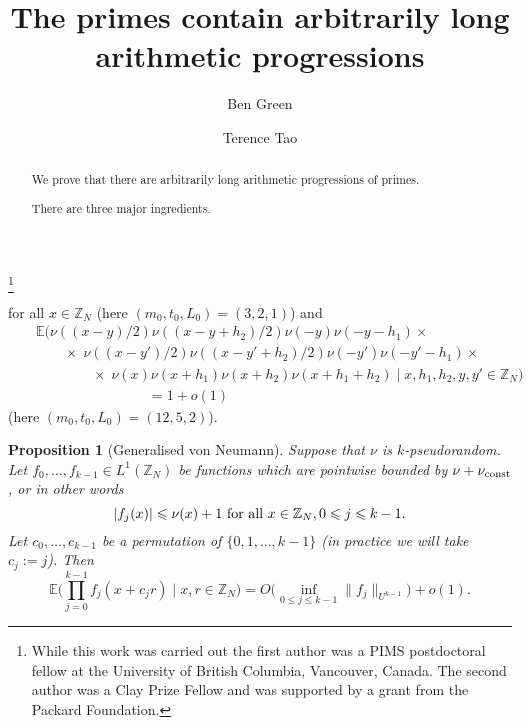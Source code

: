 \documentclass[12pt,a4paper,reqno]{amsart}
\numberwithin{equation}{section}
\theoremstyle{plain}
\newtheorem{proposition}[subsection]{Proposition}
\theoremstyle{definition}
\renewcommand{\leq}{\leqslant}
\def\vconstlem{\ensuremath \nu_{\mbox{\scriptsize \textup{const}}}}
\def\Z{{\mathbb Z}}
\def\E{{\mathbb E}}
\def\vs{\vspace{11pt}}
\def\ni{\noindent}
\begin{document}
\title{The primes contain arbitrarily long arithmetic progressions}

\author{Ben Green}
\address{School of Mathematics\\
University Walk\\
Bristol\\
BS8 1TW
}

\author{Terence Tao}
\address{Department of Mathematics\\University of California at Los Angeles\\ Los Angeles CA 90095}


\thanks{While this work was carried out the first author was a PIMS postdoctoral fellow at the University of British Columbia, Vancouver, Canada.  The second author was
a Clay Prize Fellow and was supported by a grant from the Packard Foundation.}


\begin{abstract}
We prove that there are arbitrarily long arithmetic progressions of primes.\vs  

\ni There are three major ingredients. \SNIP

\end{abstract}


\maketitle

\SNIP \ni %
for all $x \in \Z_N$ (here $(m_0,t_0, L_0) = (3,2,1)$) and
\begin{eqnarray}\nonumber& & 
\E\bigg( \nu((x-y)/2) \nu((x-y+h_2)/2) \nu(-y) \nu(-y-h_1) \times \\ & & \nonumber
\qquad \times \; \nu((x-y')/2) \nu((x-y'+h_2)/2)  \nu(-y') \nu(-y'-h_1) \times \\ & &
\qquad \qquad \times \; \nu(x) \nu(x+h_1) \nu(x+h_2) \nu(x+h_1+h_2) \; 
\bigg| \; x,h_1,h_2,y,y' \in \Z_N\bigg) \nonumber \\ & & \qquad \qquad \qquad \qquad = 1 + o(1)\label{example-3}
\end{eqnarray} (here $(m_0, t_0, L_0) = (12,5,2)$).

\SNIP

\begin{proposition}[Generalised von Neumann]\label{vn} Suppose that $\nu$ is $k$-pseudorandom. Let $f_0, \ldots, f_{k-1} \in L^1(\Z_N)$ be functions which
are pointwise bounded by $\nu+\vconstlem$, or in other words
\begin{equation}\label{fj-bounds}
 |f_j(x)| \leq \nu(x) + 1 \hbox{ for all } x \in \mathbb{Z}_N, 0 \leq j \leq k-1.
\end{equation}
Let $c_0, \ldots, c_{k-1}$ be a permutation of $\{0,1,\ldots,k-1\}$ \textup{(}in practice we will take $c_j := j$\textup{)}. Then 
\[ \E\bigg( \prod_{j=0}^{k-1} f_j(x + c_j r) \;  \bigg| \; x,r \in \mathbb{Z}_N \bigg) = O\big(\inf_{0 \leq j \leq k-1} \| f_j \|_{U^{k-1}}\big) + o(1).\]
\end{proposition}
\end{document}
